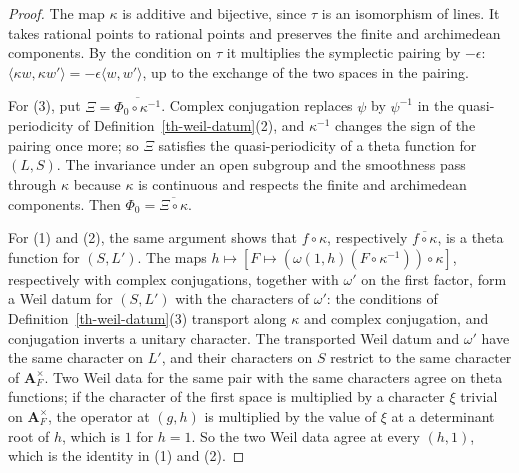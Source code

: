 \begin{proof}
The map $\kappa$ is additive and bijective, since $\tau$ is an isomorphism of
lines. It takes rational points to rational points and preserves the finite
and archimedean components. By the condition on $\tau$ it multiplies the
symplectic pairing by $-\epsilon$:
$\langle\kappa w,\kappa w'\rangle=-\epsilon\langle w,w'\rangle$, up to the
exchange of the two spaces in the pairing.

For (3), put $\Xi=\overline{\Phi_0\circ\kappa^{-1}}$. Complex conjugation
replaces $\psi$ by $\psi^{-1}$ in the quasi-periodicity of
Definition~\ref{th-weil-datum}(2), and $\kappa^{-1}$ changes the sign of the
pairing once more; so $\Xi$ satisfies the quasi-periodicity of a theta function
for $(L,S)$. The invariance under an open subgroup and the smoothness pass
through $\kappa$ because $\kappa$ is continuous and respects the finite and
archimedean components. Then $\Phi_0=\overline{\Xi\circ\kappa}$.

For (1) and (2), the same argument shows that $f\circ\kappa$, respectively
$\overline{f\circ\kappa}$, is a theta function for $(S,L')$. The maps
$h\mapsto[F\mapsto(\omega(1,h)(F\circ\kappa^{-1}))\circ\kappa]$, respectively
with complex conjugations, together with $\omega'$ on the first factor, form a
Weil datum for $(S,L')$ with the characters of $\omega'$: the conditions of
Definition~\ref{th-weil-datum}(3) transport along $\kappa$ and complex
conjugation, and conjugation inverts a unitary character. The transported
Weil datum and $\omega'$ have the same character on $L'$, and their characters
on $S$ restrict to the same character of $\mathbf A_F^\times$. Two Weil data for
the same pair with the same characters agree on theta functions; if the
character of the first space is multiplied by a character $\xi$ trivial on
$\mathbf A_F^\times$, the operator at $(g,h)$ is multiplied by the value of
$\xi$ at a determinant root of $h$, which is $1$ for $h=1$. So the two Weil
data agree at every $(h,1)$, which is the identity in (1) and (2).
\end{proof}

